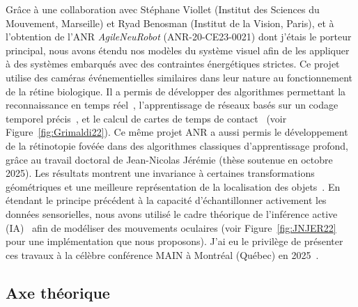 \documentclass[10pt,french,a4paper]{article}%
\begin{document}
Grâce à une collaboration avec Stéphane Viollet (Institut des Sciences du Mouvement, Marseille) et Ryad Benosman (Institut de la Vision, Paris), et à l'obtention de l'ANR \textit{AgileNeuRobot} (ANR-20-CE23-0021) dont j'étais le porteur principal, nous avons étendu nos modèles du système visuel afin de les appliquer à des systèmes embarqués avec des contraintes énergétiques strictes. Ce projet utilise des caméras événementielles similaires dans leur nature au fonctionnement de la rétine biologique. Il a permis de développer des algorithmes permettant la reconnaissance en temps réel~\citep{Grimaldi24}, l'apprentissage de réseaux basés sur un codage temporel précis~\citep{Grimaldi23BC}, et le calcul de cartes de temps de contact~\citep{Nunes23ICCV} (voir Figure~\ref{fig:Grimaldi22}).
Ce même projet ANR a aussi permis le développement de la rétinotopie fovéée dans des algorithmes classiques d'apprentissage profond, grâce au travail doctoral de Jean-Nicolas Jérémie (thèse soutenue en octobre 2025). Les résultats montrent une invariance à certaines transformations géométriques et une meilleure représentation de la localisation des objets~\citep{Jeremie25}. En étendant le principe précédent à la capacité d'échantillonner activement les données sensorielles, nous avons utilisé le cadre théorique de l'inférence active (IA)~\citep{Dauce20iwai} afin de modéliser des mouvements oculaires  (voir Figure~\ref{fig:JNJER22} pour une implémentation que nous proposons). J'ai eu  le privilège de présenter ces travaux à la célèbre conférence MAIN à Montréal (Québec) en 2025~\citep{2025-12-12_main}.
%

\subsection{Axe théorique}
\end{document}
